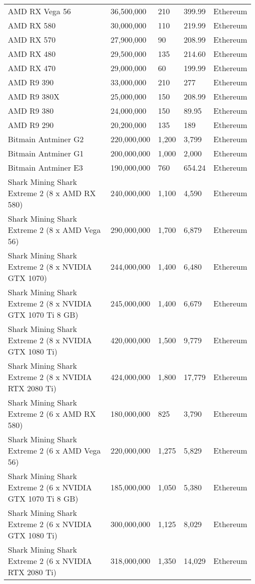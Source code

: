 \begin{longtable}{|p{}|p{}|p{}|p{}|p{}|}
  AMD RX Vega 56 & 36,500,000 & 210 & 399.99 & Ethereum \\
  AMD RX 580 & 30,000,000 & 110 & 219.99 & Ethereum \\
  AMD RX 570 & 27,900,000 & 90 & 208.99 & Ethereum \\
  AMD RX 480 & 29,500,000 & 135 & 214.60 & Ethereum \\
  AMD RX 470 & 29,000,000 & 60 & 199.99 & Ethereum \\
  AMD R9 390 & 33,000,000 & 210 & 277 & Ethereum \\
  AMD R9 380X & 25,000,000 & 150 & 208.99 & Ethereum \\
  AMD R9 380 & 24,000,000 & 150 & 89.95 & Ethereum \\
  AMD R9 290 & 20,200,000 & 135 & 189 & Ethereum \\
  Bitmain Antminer G2 & 220,000,000 & 1,200 & 3,799 & Ethereum \\
  Bitmain Antminer G1 & 200,000,000 & 1,000 & 2,000 & Ethereum \\
  Bitmain Antminer E3 & 190,000,000 & 760 & 654.24 & Ethereum \\
  Shark Mining Shark Extreme 2 (8 x AMD RX 580) & 240,000,000 & 1,100 & 4,590 & Ethereum \\
  Shark Mining Shark Extreme 2 (8 x AMD Vega 56) & 290,000,000 & 1,700 & 6,879 & Ethereum \\
  Shark Mining Shark Extreme 2 (8 x NVIDIA GTX 1070) & 244,000,000 & 1,400 & 6,480 & Ethereum \\
  Shark Mining Shark Extreme 2 (8 x NVIDIA GTX 1070 Ti 8 GB) & 245,000,000 & 1,400 & 6,679 & Ethereum \\
  Shark Mining Shark Extreme 2 (8 x NVIDIA GTX 1080 Ti) & 420,000,000 & 1,500 & 9,779 & Ethereum \\
  Shark Mining Shark Extreme 2 (8 x NVIDIA RTX 2080 Ti) & 424,000,000 & 1,800 & 17,779 & Ethereum \\
  Shark Mining Shark Extreme 2 (6 x AMD RX 580) & 180,000,000 & 825 & 3,790 & Ethereum \\
  Shark Mining Shark Extreme 2 (6 x AMD Vega 56) & 220,000,000 & 1,275 & 5,829 & Ethereum \\
  Shark Mining Shark Extreme 2 (6 x NVIDIA GTX 1070 Ti 8 GB) & 185,000,000 & 1,050 & 5,380 & Ethereum \\
  Shark Mining Shark Extreme 2 (6 x NVIDIA GTX 1080 Ti) & 300,000,000 & 1,125 & 8,029 & Ethereum \\
  Shark Mining Shark Extreme 2 (6 x NVIDIA RTX 2080 Ti) & 318,000,000 & 1,350 & 14,029 & Ethereum \\

\end{longtable}
